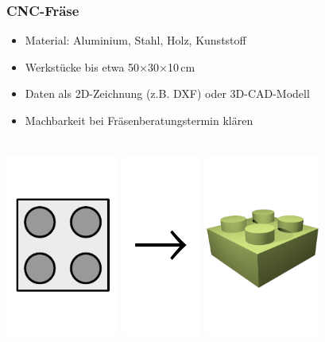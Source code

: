 \documentclass[t]{beamer}
\begin{document}
\begin{frame}
    \frametitle{CNC-Fräse}
    \begin{itemize}
        \item Material: Aluminium, Stahl, Holz, Kunststoff
        \item Werkstücke bis etwa 50$\times$30$\times$10\,cm
        \item Daten als 2D-Zeichnung (z.B. DXF) oder 3D-CAD-Modell
        \item Machbarkeit bei Fräsenberatungstermin klären
    \end{itemize}
    \begin{center}
    ~\\
    \includegraphics[height=6cm]{../img/legozeichnung.pdf}
    \includegraphics[height=6cm]{../img/pfeil.pdf}
    \includegraphics[height=6cm]{../img/fraese-lego-3d.png}

\end{center}
\end{frame}
\end{document}
